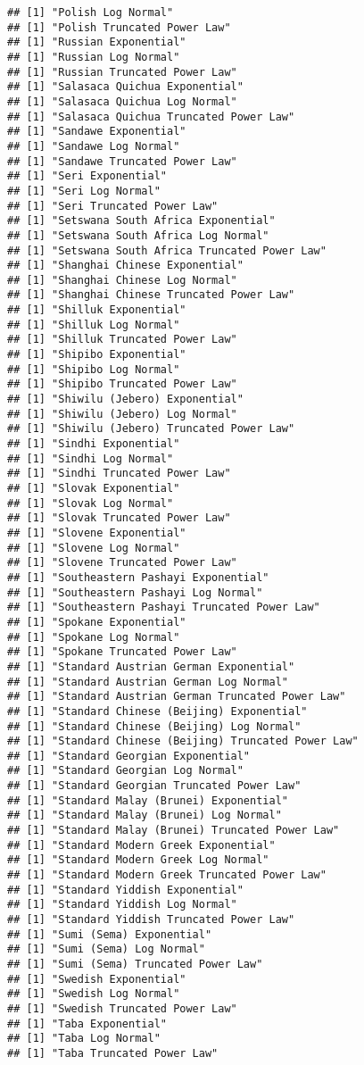 \documentclass[]{article}
\begin{document}
\begin{verbatim}
## [1] "Polish Log Normal"
## [1] "Polish Truncated Power Law"
## [1] "Russian Exponential"
## [1] "Russian Log Normal"
## [1] "Russian Truncated Power Law"
## [1] "Salasaca Quichua Exponential"
## [1] "Salasaca Quichua Log Normal"
## [1] "Salasaca Quichua Truncated Power Law"
## [1] "Sandawe Exponential"
## [1] "Sandawe Log Normal"
## [1] "Sandawe Truncated Power Law"
## [1] "Seri Exponential"
## [1] "Seri Log Normal"
## [1] "Seri Truncated Power Law"
## [1] "Setswana South Africa Exponential"
## [1] "Setswana South Africa Log Normal"
## [1] "Setswana South Africa Truncated Power Law"
## [1] "Shanghai Chinese Exponential"
## [1] "Shanghai Chinese Log Normal"
## [1] "Shanghai Chinese Truncated Power Law"
## [1] "Shilluk Exponential"
## [1] "Shilluk Log Normal"
## [1] "Shilluk Truncated Power Law"
## [1] "Shipibo Exponential"
## [1] "Shipibo Log Normal"
## [1] "Shipibo Truncated Power Law"
## [1] "Shiwilu (Jebero) Exponential"
## [1] "Shiwilu (Jebero) Log Normal"
## [1] "Shiwilu (Jebero) Truncated Power Law"
## [1] "Sindhi Exponential"
## [1] "Sindhi Log Normal"
## [1] "Sindhi Truncated Power Law"
## [1] "Slovak Exponential"
## [1] "Slovak Log Normal"
## [1] "Slovak Truncated Power Law"
## [1] "Slovene Exponential"
## [1] "Slovene Log Normal"
## [1] "Slovene Truncated Power Law"
## [1] "Southeastern Pashayi Exponential"
## [1] "Southeastern Pashayi Log Normal"
## [1] "Southeastern Pashayi Truncated Power Law"
## [1] "Spokane Exponential"
## [1] "Spokane Log Normal"
## [1] "Spokane Truncated Power Law"
## [1] "Standard Austrian German Exponential"
## [1] "Standard Austrian German Log Normal"
## [1] "Standard Austrian German Truncated Power Law"
## [1] "Standard Chinese (Beijing) Exponential"
## [1] "Standard Chinese (Beijing) Log Normal"
## [1] "Standard Chinese (Beijing) Truncated Power Law"
## [1] "Standard Georgian Exponential"
## [1] "Standard Georgian Log Normal"
## [1] "Standard Georgian Truncated Power Law"
## [1] "Standard Malay (Brunei) Exponential"
## [1] "Standard Malay (Brunei) Log Normal"
## [1] "Standard Malay (Brunei) Truncated Power Law"
## [1] "Standard Modern Greek Exponential"
## [1] "Standard Modern Greek Log Normal"
## [1] "Standard Modern Greek Truncated Power Law"
## [1] "Standard Yiddish Exponential"
## [1] "Standard Yiddish Log Normal"
## [1] "Standard Yiddish Truncated Power Law"
## [1] "Sumi (Sema) Exponential"
## [1] "Sumi (Sema) Log Normal"
## [1] "Sumi (Sema) Truncated Power Law"
## [1] "Swedish Exponential"
## [1] "Swedish Log Normal"
## [1] "Swedish Truncated Power Law"
## [1] "Taba Exponential"
## [1] "Taba Log Normal"
## [1] "Taba Truncated Power Law"

\end{verbatim}
\end{document}
